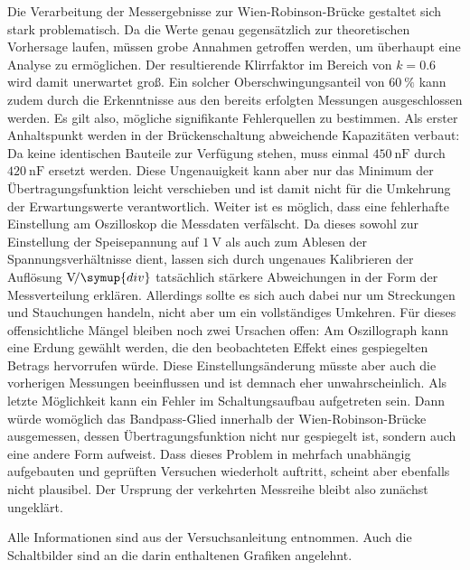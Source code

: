 Die Verarbeitung der Messergebnisse zur Wien-Robinson-Brücke gestaltet sich stark problematisch. Da die
Werte genau gegensätzlich zur theoretischen Vorhersage laufen, müssen grobe Annahmen getroffen
werden, um überhaupt eine Analyse zu ermöglichen. Der resultierende Klirrfaktor im Bereich von
$k = \num{0.6}$ wird damit unerwartet groß. Ein solcher Oberschwingungsanteil von $\qty{60}{\percent}$ kann
zudem durch die Erkenntnisse aus den bereits erfolgten Messungen ausgeschlossen werden. Es gilt also,
mögliche signifikante Fehlerquellen zu bestimmen. Als erster Anhaltspunkt werden in der Brückenschaltung
abweichende Kapazitäten verbaut: Da keine identischen Bauteile zur Verfügung stehen, muss einmal
$\qty{450}{\nano\farad}$ durch $\qty{420}{\nano\farad}$ ersetzt werden. Diese Ungenauigkeit
kann aber nur das Minimum der Übertragungsfunktion leicht verschieben und ist damit nicht für
die Umkehrung der Erwartungswerte verantwortlich. Weiter ist es möglich, dass eine fehlerhafte
Einstellung am Oszilloskop die Messdaten verfälscht. Da dieses sowohl zur Einstellung der
Speisepannung auf $\qty{1}{\volt}$ als auch zum Ablesen der Spannungsverhältnisse dient, lassen
sich durch ungenaues Kalibrieren der Auflösung $\unit{\volt} \! / \symup{div}$ tatsächlich
stärkere Abweichungen in der Form der Messverteilung erklären. Allerdings sollte es sich auch
dabei nur um Streckungen und Stauchungen handeln, nicht aber um ein vollständiges Umkehren.
Für dieses offensichtliche Mängel bleiben noch zwei Ursachen offen: \newline Am Oszillograph kann eine
Erdung gewählt werden, die den beobachteten Effekt eines gespiegelten Betrags hervorrufen würde.
Diese Einstellungsänderung müsste aber auch die vorherigen Messungen beeinflussen und ist demnach
eher unwahrscheinlich. Als letzte Möglichkeit kann ein Fehler im Schaltungsaufbau aufgetreten sein.
Dann würde womöglich das Bandpass-Glied innerhalb der Wien-Robinson-Brücke ausgemessen, dessen
Übertragungsfunktion nicht nur gespiegelt ist, sondern auch eine andere Form aufweist. Dass dieses Problem
in mehrfach unabhängig aufgebauten und geprüften Versuchen wiederholt auftritt, scheint aber ebenfalls
nicht plausibel. Der Ursprung der verkehrten Messreihe bleibt also zunächst ungeklärt. 

\vfill

Alle Informationen sind aus der Versuchsanleitung \cite{brücke} entnommen. Auch die Schaltbilder
sind an die darin enthaltenen Grafiken angelehnt.

\vfill
\vfill
\vfill
\vfill
